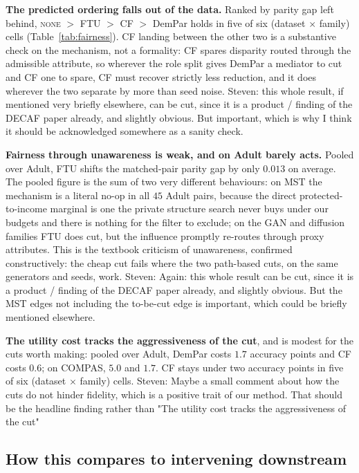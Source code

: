 \documentclass{article}
\newcommand{\s}[1]{\textcolor{Dandelion}{Steven: #1}}
\begin{document}
\textbf{The predicted ordering falls out of the data.} Ranked by parity gap
left behind, \textsc{none} $>$ FTU $>$ CF $>$ DemPar holds in five of six
(dataset $\times$ family) cells (Table~\ref{tab:fairness}). CF landing
between the other two is a substantive check on the mechanism, not a
formality: CF spares disparity routed through the admissible attribute, so
wherever the role split gives DemPar a mediator to cut and CF one to spare,
CF must recover strictly less reduction, and it does wherever the two
separate by more than seed noise. \s{this whole result, if mentioned very briefly elsewhere, can be cut, since it is a product / finding of the DECAF paper already, and slightly obvious. But important, which is why I think it should be acknowledged somewhere as a sanity check.}

\textbf{Fairness through unawareness is weak, and on Adult barely acts.}
Pooled over Adult, FTU shifts the matched-pair parity gap by only $0.013$
on average. The pooled figure is the sum of two very different behaviours:
on MST the mechanism is a literal no-op in all $45$ Adult pairs, because
the direct protected-to-income marginal is one the private structure search
never buys under our budgets and there is nothing for the filter to
exclude; on the GAN and diffusion families FTU does cut, but the influence
promptly re-routes through proxy attributes. This is the textbook criticism
of unawareness, confirmed constructively: the cheap cut fails where the two
path-based cuts, on the same generators and seeds, work. \s{Again: this whole result can be cut, since it is a product / finding of the DECAF paper already, and slightly obvious. But the MST edges not including the to-be-cut edge is important, which could be briefly mentioned elsewhere.}

\textbf{The utility cost tracks the aggressiveness of the cut}, and is modest
for the cuts worth making: pooled over Adult, DemPar costs $1.7$ accuracy
points and CF costs $0.6$; on COMPAS, $5.0$ and $1.7$. CF stays under two
accuracy points in five of six (dataset $\times$ family) cells. \s{Maybe a small comment about how the cuts do not hinder fidelity, which is a positive trait of our method. That should be the headline finding rather than "The utility cost tracks the aggressiveness of the cut"}

\subsection{How this compares to intervening downstream}
\label{sec:downstream}
\end{document}
